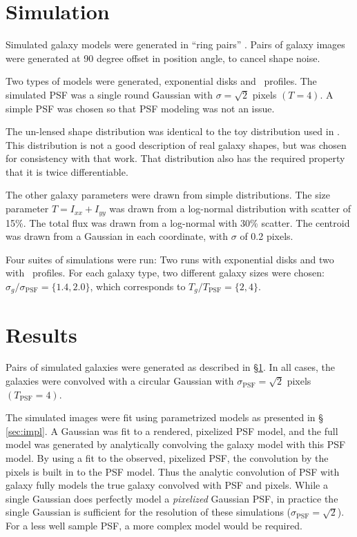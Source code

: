 \documentclass[12pt,preprint]{aastex}
\begin{document}
\section{Simulation} \label{sec:sim}

Simulated galaxy models were generated in ``ring pairs'' \citep{Nakajima2007}.
Pairs of galaxy images were generated at 90 degree offset in position
angle, to cancel shape noise.

Two types of models were generated, exponential disks and \devauc\ profiles.
The simulated PSF was a single round Gaussian with $\sigma = \sqrt{2}$ pixels
$(T=4)$.  A simple PSF was chosen so that PSF modeling was not an issue.

The un-lensed shape distribution was identical to the toy distribution used in
\cite{ba13}.  This distribution is not a good description of real galaxy
shapes, but was chosen for consistency with that work.  That distribution also
has the required property that it is twice differentiable.

The other galaxy parameters were drawn from simple distributions.  The size
parameter $T=I_{xx} + I_{yy}$ was drawn from a log-normal distribution with
scatter of 15\%.  The total flux was drawn from a log-normal with 30\% scatter.
The centroid was drawn from a Gaussian in each coordinate, with $\sigma$ of 0.2
pixels.

Four suites of simulations were run:  Two runs with exponential disks and two
with \devauc\ profiles.  For each galaxy type, two different galaxy sizes were
chosen: $\sigma_{g}/\sigma_{\textrm{PSF}} = \{1.4,2.0\}$, which corresponds to
$T_{g}/T_{\textrm{PSF}} =\{2,4\}$.


\section{Results} \label{sec:results}

Pairs of simulated galaxies were generated as described in \S \ref{sec:sim}. In
all cases, the galaxies were convolved with a circular Gaussian with
$\sigma_{\textrm{PSF}}=\sqrt{2}$ pixels $(T_{\textrm{PSF}}=4)$.

The simulated images were fit using parametrized models as presented in \S
\ref{sec:impl}.   A Gaussian was fit to a rendered, pixelized PSF model, and
the full model was generated by analytically convolving the galaxy model with
this PSF model. By using a fit to the observed, pixelized PSF, the convolution
by the pixels is built in to the PSF model. Thus the analytic convolution of
PSF with galaxy fully models the true galaxy convolved with PSF and pixels.
While a single Gaussian does perfectly model a {\it pixelized} Gaussian PSF, in
practice the single Gaussian is sufficient for the resolution of these
simulations ($\sigma_{\textrm{PSF}}=\sqrt{2}$).  For a less well sample PSF, a
more complex model would be required.
\end{document}
